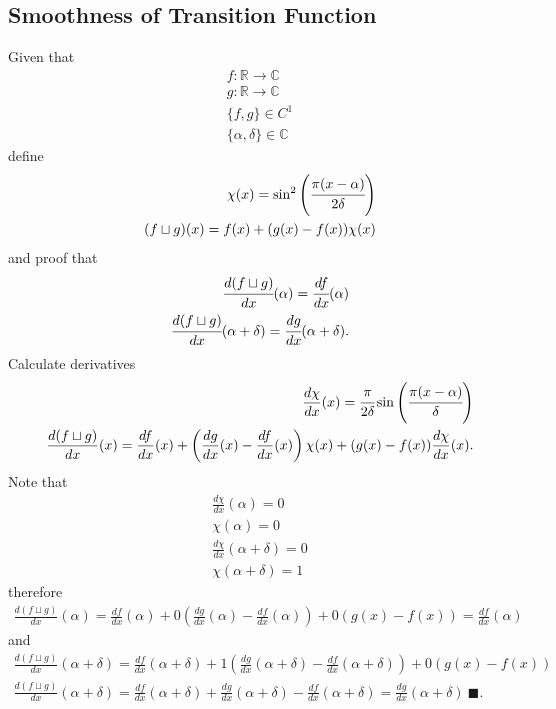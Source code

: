 \documentclass[11pt,DIV=10,final]{scrreprt} %
\newcommand{\deriv}[2]{%
  \frac{d#1}{d#2}
}
\begin{document}
\begin{appendix}
{\subsection{Smoothness of Transition Function}\label{proof:joint}
Given that
\begin{align}
  f: \mathbb{R} \rightarrow \mathbb{C} \\
  g: \mathbb{R} \rightarrow \mathbb{C} \\
  \{f, g\} \in C^{1} \\
  \{\alpha, \delta\} \in \mathbb{C}
\end{align}
define \hspace*{\fill}~\citep{hall2013quantum}
\begin{align}
  \chi(x) = \sin^{2}\left(\cfrac{\pi(x - \alpha)}{2\delta}\right) \\
  (f \sqcup g)(x) = f(x) + (g(x) - f(x)) \chi(x)
\end{align}
and proof that
\begin{align}
  \label{eq:deriv-f}
  \cfrac{d(f \sqcup g)}{dx}(\alpha) = \cfrac{df}{dx}(\alpha) \\
  \label{eq:deriv-g}
  \cfrac{d(f \sqcup g)}{dx}(\alpha + \delta) = \cfrac{dg}{dx}(\alpha + \delta).
\end{align}
Calculate derivatives
\begin{align}
  \deriv{\chi}{x}(x) = \cfrac{\pi}{2 \delta} \sin\left(\cfrac{\pi (x - \alpha)}{\delta}\right)\\
  \deriv{(f \sqcup g)}{x}(x) = \deriv{f}{x}(x) + \left(\deriv{g}{x}(x) - \deriv{f}{x}(x)\right)\chi(x) + (g(x) - f(x))\deriv{\chi}{x}(x).
\end{align}
Note that
\begin{align}
  \deriv{\chi}{x}(\alpha) = 0 \\
  \chi(\alpha) = 0 \\
  \deriv{\chi}{x}(\alpha + \delta) = 0 \\
  \chi(\alpha + \delta) = 1
\end{align}
therefore
\begin{align}
  \deriv{(f \sqcup g)}{x}(\alpha) = \deriv{f}{x}(\alpha) + 0 \left(\deriv{g}{x}(\alpha) - \deriv{f}{x}(\alpha)\right) + 0 (g(x) - f(x)) = \deriv{f}{x}(\alpha)
\end{align}
and
\begin{align}
  \deriv{(f \sqcup g)}{x}(\alpha + \delta) = \deriv{f}{x}(\alpha + \delta) + 1 \left(\deriv{g}{x}(\alpha + \delta) - \deriv{f}{x}(\alpha + \delta)\right) + 0 (g(x) - f(x)) \\
  \deriv{(f \sqcup g)}{x}(\alpha + \delta) = \deriv{f}{x}(\alpha + \delta) + \deriv{g}{x}(\alpha + \delta) - \deriv{f}{x}(\alpha + \delta) = \deriv{g}{x}(\alpha + \delta)~\blacksquare.
\end{align}

}
\end{appendix}
\end{document}
